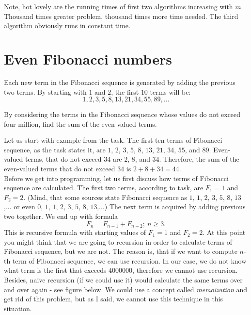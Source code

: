 \documentclass{book}
\newenvironment{task}
  {\begin{mdframed}[backgroundcolor=lightgray]}
  {\end{mdframed}}
\begin{document}
Note, hot lovely are the running times of first two algorithms increasing with $m$. Thousand times greater problem, thousand times more time needed. The third algorithm obviously runs in constant time.

\pagebreak


\section{Even Fibonacci numbers}

\begin{task}
Each new term in the Fibonacci sequence is generated by adding the previous two terms. By starting with $1$ and $2$, the first $10$ terms will be: \[1,2,3,5,8,13,21,34,55,89,\dotsc\]

By considering the terms in the Fibonacci sequence whose values do not exceed four million, find the sum of the even-valued terms.
\end{task}

Let us start with example from the task. The first ten terms of Fibonacci sequence, as the task states it, are $1$, $2$, $3$, $5$, $8$, $13$, $21$, $34$, $55$, and $89$. Even-valued terms, that do not exceed $34$ are $2$, $8$, and $34$. Therefore, the sum of the even-valued terms that do not exceed $34$ is $2+8+34 = 44$.\\

Before we get into programming, let us first discuss how terms of Fibonacci sequence are calculated. The first two terms, according to task, are $F_1 = 1$ and $F_2 = 2$. (Mind, that some sources state Fibonacci sequence as $1$, $1$, $2$, $3$, $5$, $8$, $13$,... or even $0$, $1$, $1$, $2$, $3$, $5$, $8$, $13$,...) The next term is acquired by adding previous two together. We end up with formula \[F_n = F_{n-1} + F_{n-2};~n \geq 3.\] This is recursive formula with starting values of $F_1 = 1$ and $F_2 = 2$. At this point you might think that we are going to recursion in order to calculate terms of Fibonacci sequence, but we are not. The reason is, that if we want to compute $n$-th term of Fibonacci sequence, we can use recursion. In our case, we do not know what term is the first that exceeds $4000000$, therefore we cannot use recursion. Besides, naive recursion (if we could use it) would calculate the same terms over and over again - see figure below. We could use a concept called \textit{memoization} and get rid of this problem, but as I said, we cannot use this technique in this situation.
\end{document}
